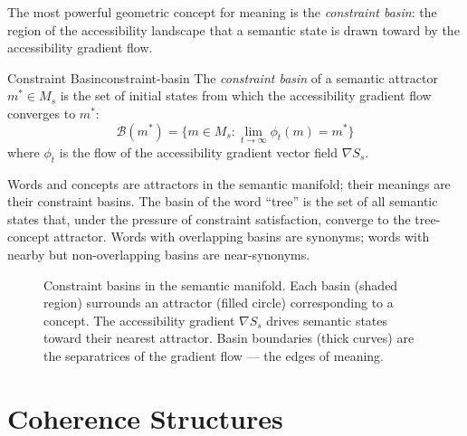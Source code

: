 The most powerful geometric concept for meaning is the \emph{constraint
basin}: the region of the accessibility landscape that a semantic state
is drawn toward by the accessibility gradient flow.

\begin{definition}{Constraint Basin}{constraint-basin}
  The \emph{constraint basin} of a semantic attractor $m^* \in M_s$
  is the set of initial states from which the accessibility gradient
  flow converges to $m^*$:
  \[
    \mathcal{B}(m^*) = \{m \in M_s : \lim_{t\to\infty}
    \phi_t(m) = m^*\}
  \]
  where $\phi_t$ is the flow of the accessibility gradient vector field
  $\nabla S_s$.
\end{definition}

Words and concepts are attractors in the semantic manifold; their meanings
are their constraint basins. The basin of the word ``tree'' is the set of
all semantic states that, under the pressure of constraint satisfaction,
converge to the tree-concept attractor. Words with overlapping basins
are synonyms; words with nearby but non-overlapping basins are near-synonyms.

\begin{figure}[h]
  \centering
  \begin{tikzpicture}[scale=1.2]
    
  \end{tikzpicture}
  \caption{Constraint basins in the semantic manifold. Each basin
    (shaded region) surrounds an attractor (filled circle) corresponding
    to a concept. The accessibility gradient $\nabla S_s$ drives semantic
    states toward their nearest attractor. Basin boundaries (thick curves)
    are the separatrices of the gradient flow — the edges of meaning.}
  \label{fig:semantic-basins}
\end{figure}

\section{Coherence Structures}

